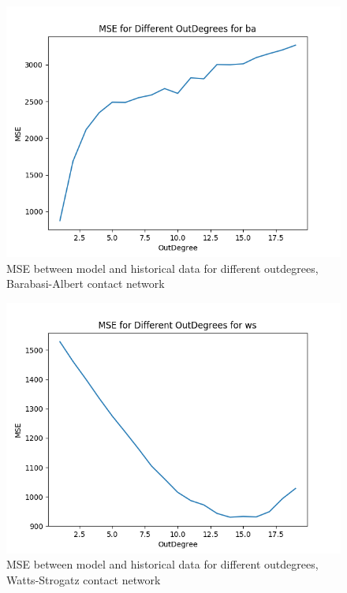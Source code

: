 \documentclass[conference]{IEEEtran}
\begin{document}
\begin{figure}[t]
    \centering
    \includegraphics[scale=0.5]{images/mse_ba.png}
    \caption{MSE between model and historical data for different outdegrees, Barabasi-Albert contact network}
    \label{fig:mse_ba}
\end{figure}

\begin{figure}[t]
    \centering
    \includegraphics[scale=0.5]{images/mse_ws.png}
    \caption{MSE between model and historical data for different outdegrees, Watts-Strogatz contact network}
    \label{fig:mse_ws}
\end{figure}
\end{document}
